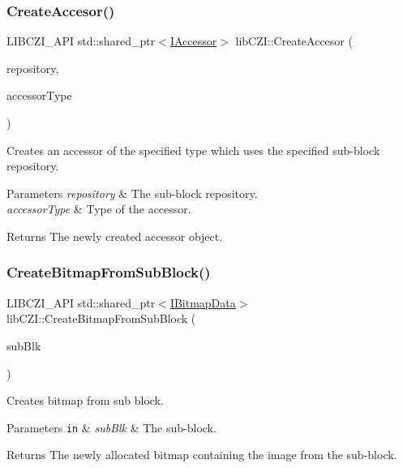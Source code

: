 \subsubsection{\texorpdfstring{Create\+Accesor()}{CreateAccesor()}}
{\footnotesize\ttfamily L\+I\+B\+C\+Z\+I\+\_\+\+A\+PI std\+::shared\+\_\+ptr$<$\hyperlink{classlib_c_z_i_1_1_i_accessor}{I\+Accessor}$>$ lib\+C\+Z\+I\+::\+Create\+Accesor (\begin{DoxyParamCaption}\item[{std\+::shared\+\_\+ptr$<$ \hyperlink{classlib_c_z_i_1_1_i_sub_block_repository}{I\+Sub\+Block\+Repository} $>$}]{repository,  }\item[{\hyperlink{namespacelib_c_z_i_aa626474324df92c9cdc7258cdb1e677c}{Accessor\+Type}}]{accessor\+Type }\end{DoxyParamCaption})}

Creates an accessor of the specified type which uses the specified sub-\/block repository. 
\begin{DoxyParams}{Parameters}
{\em repository} & The sub-\/block repository. \\
\hline
{\em accessor\+Type} & Type of the accessor. \\
\hline
\end{DoxyParams}
\begin{DoxyReturn}{Returns}
The newly created accessor object. 
\end{DoxyReturn}
\mbox{\label{namespacelib_c_z_i_aca46f77d360ed5fadb9ff68835f80bfb}} 
\subsubsection{\texorpdfstring{Create\+Bitmap\+From\+Sub\+Block()}{CreateBitmapFromSubBlock()}}
{\footnotesize\ttfamily L\+I\+B\+C\+Z\+I\+\_\+\+A\+PI std\+::shared\+\_\+ptr$<$\hyperlink{classlib_c_z_i_1_1_i_bitmap_data}{I\+Bitmap\+Data}$>$ lib\+C\+Z\+I\+::\+Create\+Bitmap\+From\+Sub\+Block (\begin{DoxyParamCaption}\item[{\hyperlink{classlib_c_z_i_1_1_i_sub_block}{I\+Sub\+Block} $\ast$}]{sub\+Blk }\end{DoxyParamCaption})}

Creates bitmap from sub block. 
\begin{DoxyParams}[1]{Parameters}
\mbox{\tt in}  & {\em sub\+Blk} & The sub-\/block. \\
\hline
\end{DoxyParams}
\begin{DoxyReturn}{Returns}
The newly allocated bitmap containing the image from the sub-\/block. 
\end{DoxyReturn}
\mbox{\label{namespacelib_c_z_i_abe978d8bd50abe94c2d37df6212859e8}} 
